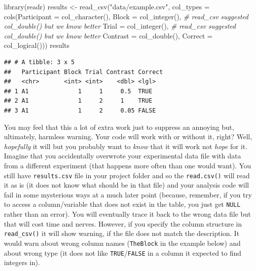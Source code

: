 \documentclass[
]{book}
\newenvironment{Shaded}{\begin{snugshade}}{\end{snugshade}}
\newcommand{\AttributeTok}[1]{\textcolor[rgb]{0.77,0.63,0.00}{#1}}
\newcommand{\CommentTok}[1]{\textcolor[rgb]{0.56,0.35,0.01}{\textit{#1}}}
\newcommand{\FunctionTok}[1]{\textcolor[rgb]{0.00,0.00,0.00}{#1}}
\newcommand{\NormalTok}[1]{#1}
\newcommand{\OtherTok}[1]{\textcolor[rgb]{0.56,0.35,0.01}{#1}}
\newcommand{\StringTok}[1]{\textcolor[rgb]{0.31,0.60,0.02}{#1}}
\begin{document}
\begin{Shaded}
\begin{Highlighting}[]
\FunctionTok{library}\NormalTok{(readr)}
\NormalTok{results }\OtherTok{\textless{}{-}} \FunctionTok{read\_csv}\NormalTok{(}\StringTok{"data/example.csv"}\NormalTok{, }
                    \AttributeTok{col\_types =} \FunctionTok{cols}\NormalTok{(}\AttributeTok{Participant =} \FunctionTok{col\_character}\NormalTok{(),}
                                     \AttributeTok{Block =} \FunctionTok{col\_integer}\NormalTok{(), }\CommentTok{\# read\_csv suggested col\_double() but we know better}
                                     \AttributeTok{Trial =} \FunctionTok{col\_integer}\NormalTok{(), }\CommentTok{\# read\_csv suggested col\_double() but we know better}
                                     \AttributeTok{Contrast =} \FunctionTok{col\_double}\NormalTok{(),}
                                     \AttributeTok{Correct =} \FunctionTok{col\_logical}\NormalTok{()))}
\NormalTok{results}
\end{Highlighting}
\end{Shaded}

\begin{verbatim}
## # A tibble: 3 x 5
##   Participant Block Trial Contrast Correct
##   <chr>       <int> <int>    <dbl> <lgl>  
## 1 A1              1     1     0.5  TRUE   
## 2 A1              1     2     1    TRUE   
## 3 A1              1     2     0.05 FALSE
\end{verbatim}

You may feel that this a lot of extra work just to suppress an annoying but, ultimately, harmless warning. Your code will work with or without it, right? Well, \emph{hopefully} it will but you probably want to \emph{know} that it will work not \emph{hope} for it. Imagine that you accidentally overwrote your experimental data file with data from a different experiment (that happens more often than one would want). You still have \texttt{results.csv} file in your project folder and so the \texttt{read.csv()} will read it as is (it does not know what should be in that file) and your analysis code will fail in some mysterious ways at a much later point (because, remember, if you try to access a column/variable that does not exist in the table, you just get \texttt{NULL} rather than an error). You will eventually trace it back to the wrong data file but that will cost time and nerves. However, if you specify the column structure in \texttt{read\_csv()} it will show warning, if the file does not match the description. It would warn about wrong column names (\texttt{TheBlock} in the example below) and about wrong type (it does not like \texttt{TRUE}/\texttt{FALSE} in a column it expected to find integers in).
\end{document}
